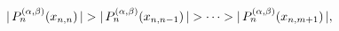 $|\mathop{P^{(\alpha,\beta)}_{n}\/}\nolimits\!\left(x_{n,n}\right)|>|\mathop{P^%
{(\alpha,\beta)}_{n}\/}\nolimits\!\left(x_{n,n-1}\right)|>\cdots>|\mathop{P^{(%
\alpha,\beta)}_{n}\/}\nolimits\!\left(x_{n,m+1}\right)|,$